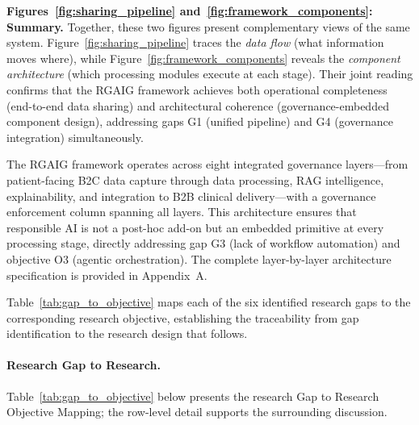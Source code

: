 \noindent\textbf{Figures~\ref{fig:sharing_pipeline} and~\ref{fig:framework_components}: Summary.} Together, these two figures present complementary views of the same system. Figure~\ref{fig:sharing_pipeline} traces the \textit{data flow} (what information moves where), while Figure~\ref{fig:framework_components} reveals the \textit{component architecture} (which processing modules execute at each stage). Their joint reading confirms that the RGAIG framework achieves both operational completeness (end-to-end data sharing) and architectural coherence (governance-embedded component design), addressing gaps G1 (unified pipeline) and G4 (governance integration) simultaneously.
\fi %

\label{sec:framework_components}
\label{fig:framework_components}

The RGAIG framework operates across eight integrated governance layers---from patient-facing B2C data capture through data processing, RAG intelligence, explainability, and integration to B2B clinical delivery---with a governance enforcement column spanning all layers. This architecture ensures that responsible AI is not a post-hoc add-on but an embedded primitive at every processing stage, directly addressing gap G3 (lack of workflow automation) and objective O3 (agentic orchestration). The complete layer-by-layer architecture specification is provided in Appendix~A.

\noindent Table~\ref{tab:gap_to_objective} maps each of the six identified research gaps to the corresponding research objective, establishing the traceability from gap identification to the research design that follows.

\paragraph{Research Gap to Research.}


\noindent Table~\ref{tab:gap_to_objective} below presents the research Gap to Research Objective Mapping; the row-level detail supports the surrounding discussion.

